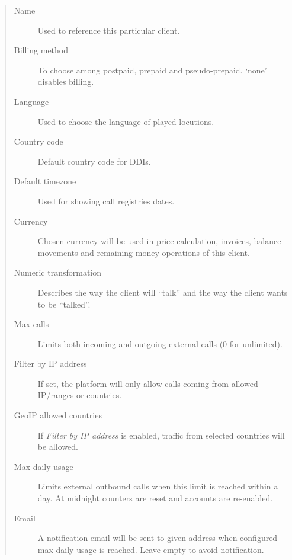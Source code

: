 \documentclass[letterpaper,10pt,spanish]{sphinxmanual}
\begin{document}
\begin{quote}
\begin{description}
\item[{Name}] \leavevmode
Used to reference this particular client.

\item[{Billing method}] \leavevmode
To choose among postpaid, prepaid and pseudo-prepaid. `none' disables billing.

\item[{Language}] \leavevmode
Used to choose the language of played locutions.

\item[{Country code}] \leavevmode
Default country code for DDIs.

\item[{Default timezone}] \leavevmode
Used for showing call registries dates.

\item[{Currency}] \leavevmode
Chosen currency will be used in price calculation, invoices, balance movements and
remaining money operations of this client.

\item[{Numeric transformation}] \leavevmode
Describes the way the client will ``talk'' and the way the client wants to be ``talked''.

\item[{Max calls}] \leavevmode
Limits both incoming and outgoing external calls (0 for unlimited).

\item[{Filter by IP address}] \leavevmode
If set, the platform will only allow calls coming from allowed IP/ranges or countries.

\item[{GeoIP allowed countries}] \leavevmode
If \emph{Filter by IP address} is enabled, traffic from selected countries will be allowed.

\item[{Max daily usage}] \leavevmode
Limits external outbound calls when this limit is reached within a day. At midnight counters are reset and
accounts are re-enabled.

\item[{Email}] \leavevmode
A notification email will be sent to given address when configured max daily usage is reached. Leave empty to
avoid notification.

\end{description}
\end{quote}
\end{document}
